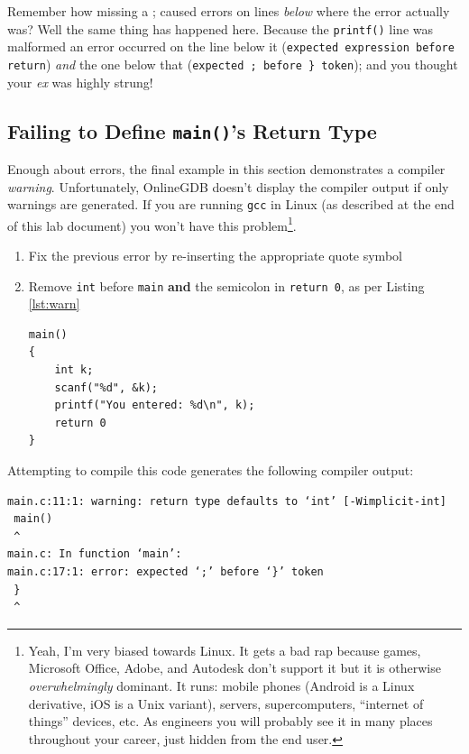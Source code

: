 \documentclass{lab}
\begin{document}
Remember how missing a ; caused errors on lines \textit{below} where the error actually was? Well the same thing has happened here. Because the \texttt{printf()} line was malformed an error occurred on the line below it (\texttt{expected expression before return}) \textit{and} the one below that (\texttt{expected ; before \} token}); and you thought your \textit{ex} was highly strung!

\pagebreak

\subsection{Failing to Define \texttt{main()}'s Return Type}

Enough about errors, the final example in this section demonstrates a compiler \textit{warning}. Unfortunately, OnlineGDB doesn't display the compiler output if only warnings are generated. If you are running \texttt{gcc} in Linux (as described at the end of this lab document) you won't have this problem\footnote{Yeah, I'm very biased towards Linux. It gets a bad rap because games, Microsoft Office, Adobe, and Autodesk don't support it but it is otherwise \textit{overwhelmingly} dominant. It runs: mobile phones (Android is a Linux derivative, iOS is a Unix variant), servers, supercomputers, ``internet of things'' devices, etc. As engineers you will probably see it in many places throughout your career, just hidden from the end user.}.

\begin{task}{}{}
\begin{enumerate}
\item Fix the previous error by re-inserting the appropriate quote symbol
\item Remove \texttt{int} before \texttt{main} \textbf{and} the semicolon in \texttt{return 0}, as per Listing \ref{lst:warn}

\begin{lstlisting}[style=CStyle,caption=Example code which generates a warning.,label=lst:warn]
main()
{
    int k;
    scanf("%d", &k);
    printf("You entered: %d\n", k);
    return 0
}
\end{lstlisting}
\end{enumerate}
\end{task}

Attempting to compile this code generates the following compiler output:

\begin{lstlisting}[basicstyle=\ttfamily,frame=single,caption=Compiler output produced when \texttt{main()} return type is omitted.,captionpos=b]
main.c:11:1: warning: return type defaults to ‘int’ [-Wimplicit-int]
 main()
 ^
main.c: In function ‘main’:
main.c:17:1: error: expected ‘;’ before ‘}’ token
 }
 ^
\end{lstlisting}
\end{document}
